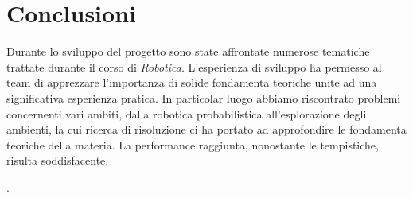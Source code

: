 \documentclass[a4paper]{article}
\begin{document}
	\section{Conclusioni}\label{sec:Conclusioni}
	Durante lo sviluppo del progetto sono state affrontate numerose tematiche trattate durante il corso di \textit{Robotica}. L'esperienza di sviluppo ha permesso al team di apprezzare l'importanza di solide fondamenta teoriche unite ad una significativa esperienza pratica. In particolar luogo abbiamo riscontrato problemi concernenti vari ambiti, dalla robotica probabilistica all'esplorazione degli ambienti, la cui ricerca di risoluzione ci ha portato ad approfondire le fondamenta teoriche della materia. La performance raggiunta, nonostante le tempistiche, risulta soddisfacente.
	
	\newpage
	
	.
\end{document}
